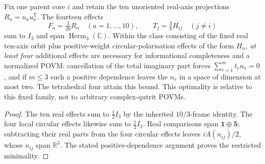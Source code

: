 \documentclass[12pt,a4paper]{article}
\begin{document}
\begin{corollary}
\label{p2c:cor:cc12-fourteen-core-povm}
Fix one parent core $i$ and retain the ten unoriented real-axis
projections $R_a=u_au_a^{\mathsf T}$. The fourteen effects
\[
 \boxed{F_a=\tfrac3{20}R_a\quad(a=1,\ldots,10),\qquad
 T_j=\tfrac38H_{ij}\quad(j\ne i)}
\]
sum to $I_3$ and span $\operatorname{Herm}_3(\mathbb C)$.
Within the class consisting of the fixed real ten-axis orbit plus
positive-weight circular-polarisation effects of the form $H_n$,
\emph{at least four} additional effects are necessary for
informational completeness and a normalized POVM: cancellation of
the total imaginary part forces $\sum_{r=1}^m t_rn_r=0$, and if
$m\le3$ such a positive dependence leaves the $n_r$ in a space
of dimension at most two. The tetrahedral four attain this bound.
This optimality is relative to this fixed family, not to arbitrary
complex-qutrit POVMs.
\end{corollary}
\begin{proof}
The ten real effects sum to $\tfrac12I_3$ by the inherited
$10/3$-frame identity. The four local circular effects likewise sum
to $\tfrac12I_3$. Real comparisons span $\mathbf1\oplus\mathbf5$;
subtracting their real parts from the four circular effects leaves
$iA(n_{ij})/2$, whose $n_{ij}$ span $\mathbb R^3$.
The stated positive-dependence argument proves the restricted
minimality.
\end{proof}
\end{document}
